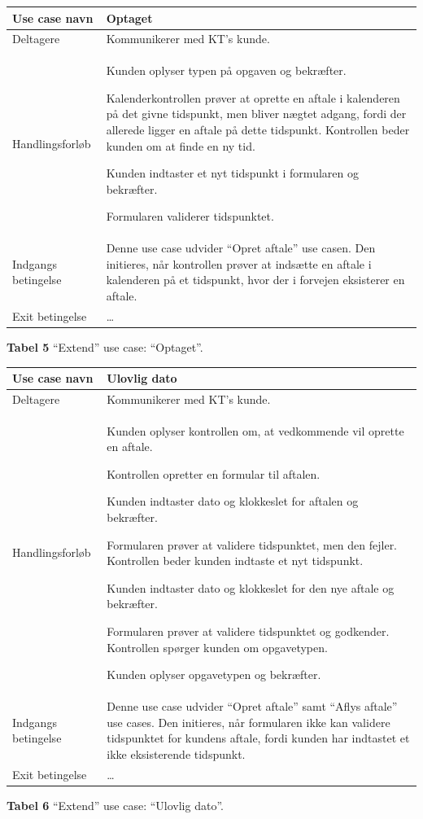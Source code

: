 \documentclass[12pt]{article}   %
\newcommand{\nextitem}{\par\hspace*{\labelsep}\textbullet\hspace*{\labelsep}}
\begin{document}
\begin{tabular}{l p{10cm}}
Use case navn & Optaget \\ \hline
Deltagere & \nextitem Kommunikerer med KT's kunde. 
            \\ \hline
Handlingsforløb &
	\nextitem Kunden oplyser typen på opgaven og bekræfter. 
	\nextitem Kalenderkontrollen prøver at oprette en aftale i kalenderen
	på det givne tidspunkt, men bliver nægtet adgang, fordi der allerede
	ligger en aftale på dette tidspunkt. Kontrollen beder kunden om at
	finde en ny tid.
	\nextitem Kunden indtaster et nyt tidspunkt i formularen og bekræfter. 
	\nextitem Formularen validerer tidspunktet.
	\\ \hline
	Indgangs betingelse &
		\nextitem Denne use case udvider ``Opret aftale'' use casen.
		Den initieres, når kontrollen prøver at indsætte en aftale i
		kalenderen på et tidspunkt, hvor der i forvejen eksisterer en
		aftale. 
		\\ \hline
Exit betingelse & \dots
	\\ \hline
\end{tabular}
\begin{center}
\textbf{Tabel 5} ``Extend'' use case: ``Optaget''.       
\end{center}
\vspace{0.5cm}


\begin{tabular}{l p{10cm}}
Use case navn & Ulovlig dato \\ \hline
Deltagere & \nextitem Kommunikerer med KT's kunde.
            \\ \hline
Handlingsforløb &
	\nextitem Kunden oplyser kontrollen om, at vedkommende vil oprette en
	aftale.
	\nextitem Kontrollen opretter en formular til aftalen.
	\nextitem Kunden indtaster dato og klokkeslet for aftalen og
	bekræfter.
	\nextitem Formularen prøver at validere tidspunktet, men den fejler.
	Kontrollen beder kunden indtaste et nyt tidspunkt.
	\nextitem Kunden indtaster dato og klokkeslet for den nye aftale og
	bekræfter.
	\nextitem Formularen prøver at validere tidspunktet og godkender.
	Kontrollen spørger kunden om opgavetypen.
	\nextitem Kunden oplyser opgavetypen og bekræfter.
	\\ \hline
	Indgangs betingelse &
		\nextitem Denne use case udvider ``Opret aftale'' samt ``Aflys
		aftale'' use cases. Den initieres, når formularen ikke kan
		validere tidspunktet for kundens aftale, fordi kunden har
		indtastet et ikke eksisterende tidspunkt.  
		\\ \hline
Exit betingelse & \dots
	\\ \hline
\end{tabular}
\begin{center}
\textbf{Tabel 6} ``Extend'' use case: ``Ulovlig dato''.       
\end{center}
\vspace{0.5cm}
\end{document}
